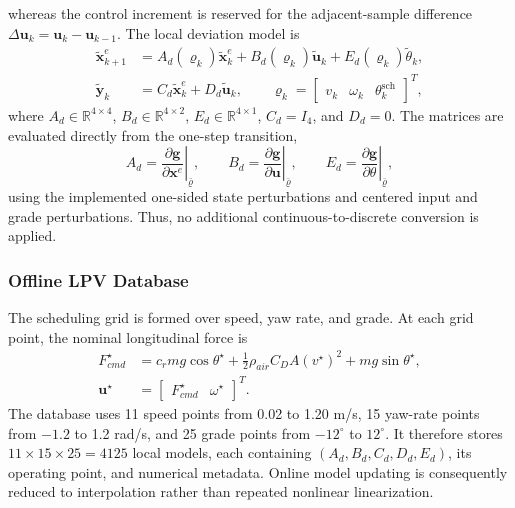 \documentclass{ieeeaccess}
\begin{document}
whereas the control increment is reserved for the adjacent-sample difference $\Delta\bm u_k=\bm u_k-\bm u_{k-1}$. The local deviation model is
\begin{align}
\widetilde{\bm{x}}^{e}_{k+1}
&=A_d(\boldsymbol\varrho_k)\widetilde{\bm{x}}^{e}_k
+B_d(\boldsymbol\varrho_k)\widetilde{\bm{u}}_k
+E_d(\boldsymbol\varrho_k)\widetilde\theta_k,\nonumber\\
\widetilde{\bm y}_k&=C_d\widetilde{\bm x}^e_k+D_d\widetilde{\bm u}_k,
\qquad
\boldsymbol\varrho_k=
\begin{bmatrix}v_k&\omega_k&\theta^{\mathrm{sch}}_k\end{bmatrix}^{T},
\label{eq:lpv_state}
\end{align}
where $A_d\in\mathbb R^{4\times4}$, $B_d\in\mathbb R^{4\times2}$, $E_d\in\mathbb R^{4\times1}$, $C_d=I_4$, and $D_d=0$. The matrices are evaluated directly from the one-step transition,
\begin{equation}
A_d=\left.\frac{\partial\bm g}{\partial\bm x^e}\right|_{\bar{\boldsymbol\varrho}},
\qquad
B_d=\left.\frac{\partial\bm g}{\partial\bm u}\right|_{\bar{\boldsymbol\varrho}},
\qquad
E_d=\left.\frac{\partial\bm g}{\partial\theta}\right|_{\bar{\boldsymbol\varrho}},
\label{eq:discrete_transition_jacobians}
\end{equation}
using the implemented one-sided state perturbations and centered input and grade perturbations. Thus, no additional continuous-to-discrete conversion is applied.

\subsubsection{Offline LPV Database}

The scheduling grid is formed over speed, yaw rate, and grade. At each grid point, the nominal longitudinal force is
\begin{equation}
\begin{aligned}
F_{cmd}^{\star}
&=c_rmg\cos\theta^{\star}
+\frac{1}{2}\rho_{air}C_DA(v^{\star})^2
+mg\sin\theta^{\star},\\
\bm u^{\star}
&=\begin{bmatrix}F_{cmd}^{\star}&\omega^{\star}\end{bmatrix}^{T}.
\end{aligned}
\label{eq:workpoint_force}
\end{equation}
The database uses 11 speed points from 0.02 to 1.20 m/s, 15 yaw-rate points from $-1.2$ to 1.2 rad/s, and 25 grade points from $-12^{\circ}$ to $12^{\circ}$. It therefore stores $11\times15\times25=4125$ local models, each containing $(A_d,B_d,C_d,D_d,E_d)$, its operating point, and numerical metadata. Online model updating is consequently reduced to interpolation rather than repeated nonlinear linearization.
\end{document}
